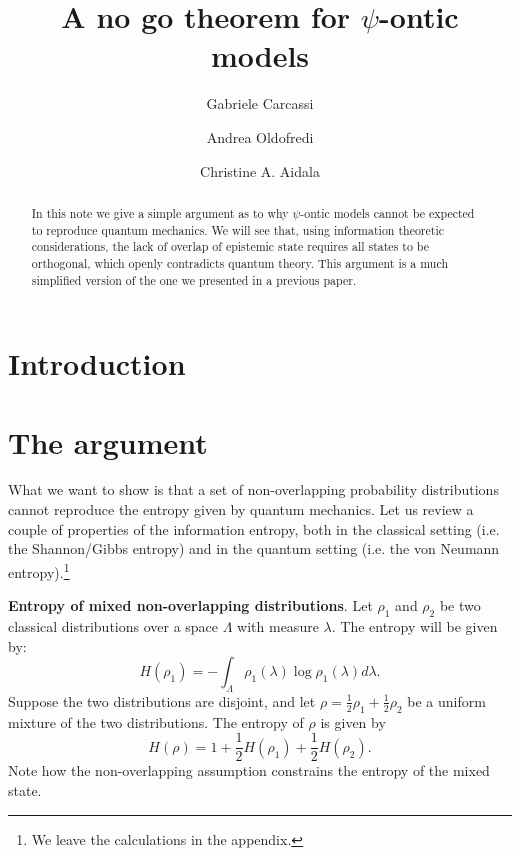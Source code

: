 \documentclass[10pt,twocolumn, nofootinbib]{revtex4-2}
\begin{document}
\title{A no go theorem for $\psi$-ontic models}
\author{Gabriele Carcassi}
\author{Andrea Oldofredi}
\author{Christine A. Aidala}

\date{}


\begin{abstract}
In this note we give a simple argument as to why $\psi$-ontic models cannot be expected to reproduce quantum mechanics. We will see that, using information theoretic considerations, the lack of overlap of epistemic state requires all states to be orthogonal, which openly contradicts quantum theory. This argument is a much simplified version of the one we presented in a previous paper.
\end{abstract}

\maketitle

\section{Introduction}


\section{The argument}

What we want to show is that a set of non-overlapping probability distributions cannot reproduce the entropy given by quantum mechanics. Let us review a couple of properties of the information entropy, both in the classical setting (i.e. the Shannon/Gibbs entropy) and in the quantum setting (i.e. the von Neumann entropy).\footnote{We leave the calculations in the appendix.}

\textbf{Entropy of mixed non-overlapping distributions}. Let $\rho_1$ and $\rho_2$ be two classical distributions over a space $\Lambda$ with measure $\lambda$. The entropy will be given by:
\begin{equation}\label{shannon_entropy}
	H(\rho_1) = - \int_\Lambda \rho_1(\lambda) \log \rho_1(\lambda) d\lambda.
\end{equation}
Suppose the two distributions are disjoint, and let $\rho = \frac{1}{2} \rho_1 + \frac{1}{2} \rho_2$ be a uniform mixture of the two distributions. The entropy of $\rho$ is given by
\begin{equation}\label{entropy_nonoverlap}
	H(\rho) = 1 + \frac{1}{2} H(\rho_1) + \frac{1}{2} H(\rho_2).
\end{equation}
Note how the non-overlapping assumption constrains the entropy of the mixed state.
\end{document}
